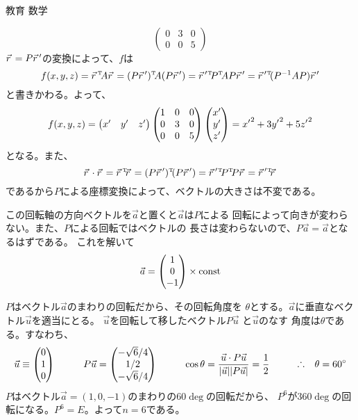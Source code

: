 \documentclass[fleqn]{jbook}
\begin{document}
\begin{answer}{教育 数学}{}
\begin{subanswers}
\begin{subsubanswers}
\[\begin{pmatrix}
            0 & 3 & 0 \\
            0 & 0 & 5 \end{pmatrix} \]
%
    $\vec{r}\,=P\vec{r}\,^{\prime}$の変換によって、$f$は
%
    \[ f(x,y,z)%
         =   \Trans{\vr} A\vr%
         =   \Trans{(P\vr^{\prime})} A (P\vr^{\prime})%
         =   \Trans{\vr^{\prime}}\Trans{P} A P \vr^{\prime}%
         =   \Trans{\vr^{\prime}} (P^{-1} A P) \vr^{\prime} \]
%
    と書きかわる。よって、
%
    \[ f(x,y,z)%
       = \vectT{x^{\prime}}{y^{\prime}}{z^{\prime}}
         \begin{pmatrix}
           1 & 0 & 0 \\
           0 & 3 & 0 \\
           0 & 0 & 5 \end{pmatrix}
         \vect{x^{\prime}}{y^{\prime}}{z^{\prime}}
       ={x^{\prime}}^2 + 3{y^{\prime}}^2 + 5{z^{\prime}}^2 \]
%
    となる。また、
%
    \[ \vr\cdot\vr%
       = \Trans{\vr}\vr
       = \Trans{(P \vr^{\prime})}
         (P \vr^{\prime})
       = \Trans{\vr^{\prime}} \Trans{P} P \vr
       = \Trans{\vr^{\prime}} \vr \]
%
    であるから$P$による座標変換によって、ベクトルの大きさは不変である。

  \SubSubAnswer
    この回転軸の方向ベクトルを$\vec{a}$と置くと$\vec{a}$は$P$による
    回転によって向きが変わらない。また、$P$による回転ではベクトルの
    長さは変わらないので、$P\vec{a}=\vec{a}$となるはずである。
    これを解いて
%
    \[ \vec{a} = \begin{pmatrix}1\cr0\cr-1\end{pmatrix} \times {\rm  const} \]
%

  \SubSubAnswer
    $P$はベクトル$\vec{a}$のまわりの回転だから、その回転角度を
    $\theta$とする。$\vec{a}$に垂直なベクトル$\vec{u}$を適当にとる。
    $\vec{u}$を回転して移したベクトル$P\vec{u}$ と$\vec{u}$のなす
    角度は$\theta$である。すなわち、
%
    \[ \vec{u} \equiv \vect{0}{1}{0} \hspace{10mm}%
       P\vec{u}= \vect{-\sqrt{6}/4}{1/2}{-\sqrt{6}/4} \hspace{10mm}%
      \cos\theta%
       = \frac{\vec{u}\cdot P\vec{u}}{|\vec{u}||P\vec{u}|}%
       = \frac{1}{2} \hspace{10mm}%
       \Yueni \theta=60\deg \]
%
    $P$はベクトル$\vec{a}=(1,0,-1)$のまわりの$60\deg$の回転だから、
    $P^6$が$360\deg$の回転になる。$P^6=E$。よって$n=6$である。

  \end{subsubanswers}


\end{subanswers}
\end{answer}
\end{document}
